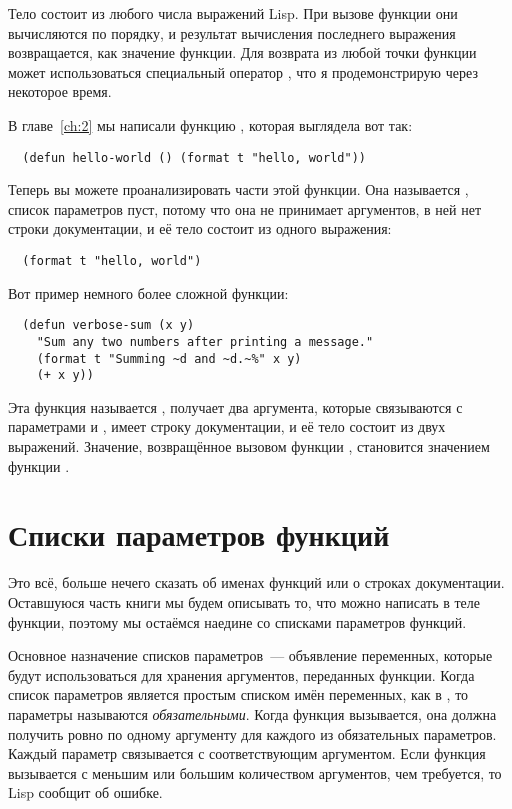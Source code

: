 Тело  состоит из любого числа выражений Lisp.  При вызове функции они
вычисляются по порядку, и результат вычисления последнего выражения возвращается, как
значение функции.  Для возврата из любой точки функции может использоваться специальный
оператор , что я продемонстрирую через некоторое время.

В главе~\ref{ch:2} мы написали функцию , которая выглядела вот так:

\begin{lstlisting}
  (defun hello-world () (format t "hello, world"))
\end{lstlisting}

Теперь вы можете проанализировать части этой функции.  Она называется ,
список параметров пуст, потому что она не принимает аргументов, в ней нет строки
документации, и её тело состоит из одного выражения:

\begin{lstlisting}
  (format t "hello, world")
\end{lstlisting}

Вот пример немного более сложной функции:

\begin{lstlisting}
  (defun verbose-sum (x y)
    "Sum any two numbers after printing a message."
    (format t "Summing ~d and ~d.~%" x y)
    (+ x y))
\end{lstlisting}

Эта функция называется , получает два аргумента, которые связываются с
параметрами  и , имеет строку документации, и её тело состоит из двух
выражений.  Значение, возвращённое вызовом функции \code{+}, становится значением функции
.

\section{Списки параметров функций}

Это всё, больше нечего сказать об именах функций или о строках документации. Оставшуюся
часть книги мы будем описывать то, что можно написать в теле функции, поэтому мы остаёмся
наедине со списками параметров функций.

Основное назначение списков параметров~--- объявление переменных, которые будут
использоваться для хранения аргументов, переданных функции.  Когда список параметров
является простым списком имён переменных, как в , то параметры
называются \textit{обязательными}.  Когда функция вызывается, она должна получить ровно по
одному аргументу для каждого из обязательных параметров.  Каждый параметр связывается с
соответствующим аргументом.  Если функция вызывается с меньшим или большим количеством
аргументов, чем требуется, то Lisp сообщит об ошибке.

